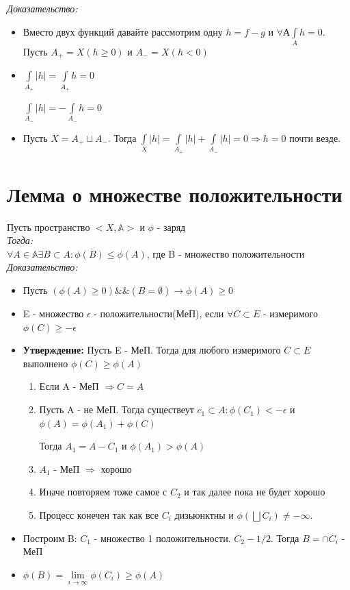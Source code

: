 \documentclass[paper=a4, fontsize=17pt]{article}
\begin{document}
	\emph{Доказательство: }
	
		\begin{itemize}
			\item 
			Вместо двух функций давайте рассмотрим одну $h = f - g$ и $\forall А \int\limits_A h = 0$. Пусть $A_{+} = X(h\geq 0)$ и $A_- = X(h < 0)$
			\item
			$\int\limits_{A_+} |h| = \int\limits_{A_+} h = 0$ \par
			$\int\limits_{A_-} |h| = -\int\limits_{A_-} h = 0$ 
			\item
			Пусть $X = A_+ \sqcup A_-$. Тогда $\int\limits_X |h| = \int\limits_{A_+} |h| + \int\limits_{A_-} |h| = 0 \Rightarrow h = 0$ почти везде.
		\end{itemize}
\section{Лемма о множестве положительности}
	Пусть пространство $<X, \mathbb{A}>$ и $\phi$ - заряд\\
	\emph{Тогда: }\\
		$\forall A\in \mathbb{A} \exists B \subset A : \phi(B) \leq \phi(A)$, где B - множество положительности \\
	\emph{Доказательство: } \\
		
		\begin{itemize}
			\item Пусть $(\phi(A) \geq 0) \&\& (B = \emptyset) \rightarrow \phi(A) \geq 0$
			\item E - множество $\epsilon$ - положительности(МеП), если  $\forall C \subset E$ - измеримого $ \phi(C) \geq -\epsilon$
			\item \textbf{Утверждение: }Пусть E - МеП. Тогда для любого измеримого $C \subset E$ выполнено $\phi(C) \geq \phi(A)$
			\begin{enumerate}
				\item Если A - МеП $\Rightarrow C = A$
				\item Пусть A - не МеП. Тогда существеут $c_1 \subset A : \phi(C_1) < -\epsilon$ и $\phi(A) = \phi(A_1) + \phi(C)$
				
				Тогда $A_1 = A - C_1$ и $\phi(A_1) > \phi(A)$
				\item $A_1$ - МеП $\Rightarrow$ хорошо
				\item Иначе повторяем тоже самое с $C_2$ и так далее пока не будет хорошо
				\item Процесс конечен так как все $C_i$ дизьюнктны и $\phi(\bigsqcup C_i) \neq -\infty.$
			\end{enumerate}
			\item Построим B: $C_1$ - множество 1 положительности. $C_2 - 1/2$. Тогда $B = \cap C_i$ - МеП
			\item $\phi(B) = \lim\limits_{i \rightarrow \infty} \phi(C_i) \geq \phi(A)$ 
		\end{itemize}	
\end{document}

